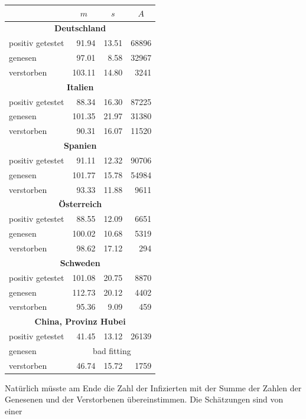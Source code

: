 \documentclass[a4paper,11pt]{article}
\begin{document}
\begin{center}
  \begin{tabular}{|l|r|r|r|}\hline
    & \multicolumn{1}{|c|}{$m$} & \multicolumn{1}{|c|}{$s$}
    & \multicolumn{1}{|c|}{$A$} \\\hline
    \multicolumn{4}{|c|}{\bf Deutschland}\\\hline
    positiv getestet   & 91.94 & 13.51 &  68896\\
    genesen  & 97.01 &  8.58 &  32967\\
    verstorben       &103.11 & 14.80 &   3241\\\hline
    \multicolumn{4}{|c|}{\bf Italien}\\\hline
    positiv getestet   & 88.34 & 16.30 &  87225\\
    genesen  &101.35 & 21.97 &  31380\\
    verstorben       & 90.31 & 16.07 &  11520\\\hline
    \multicolumn{4}{|c|}{\bf Spanien}\\\hline
    positiv getestet   & 91.11 & 12.32 &  90706\\
    genesen  &101.77 & 15.78 &  54984\\
    verstorben       & 93.33 & 11.88 &   9611\\\hline
    \multicolumn{4}{|c|}{\bf Österreich}\\\hline
    positiv getestet   & 88.55 & 12.09 &   6651\\
    genesen  &100.02 & 10.68 &   5319\\
    verstorben       & 98.62 & 17.12 &    294\\\hline
    \multicolumn{4}{|c|}{\bf Schweden}\\\hline
    positiv getestet   &101.08 & 20.75 &   8870\\
    genesen  &112.73 & 20.12 &   4402\\
    verstorben       & 95.36 &  9.09 &    459\\\hline
    \multicolumn{4}{|c|}{\bf China, Provinz Hubei}\\\hline
    positiv getestet   & 41.45 & 13.12 &  26139\\
    genesen  & \multicolumn{3}{|c|}{bad fitting}\\
    verstorben       & 46.74 & 15.72 &   1759\\\hline
  \end{tabular}
\end{center}
Natürlich müsste am Ende die Zahl der Infizierten mit der Summe der Zahlen der
Genesenen und der Verstorbenen übereinstimmen.  Die Schätzungen sind von einer
\end{document}
